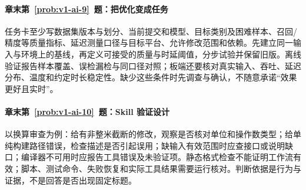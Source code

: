 \paragraph*{章末第~\ref{prob:v1-ai-9}~题：把优化变成任务}
\begin{solution}
任务卡至少写数据集版本与划分、当前提交和模型、目标类别及困难样本、召回/精度等质量指标、延迟测量口径与目标平台、允许修改范围和依赖。先建立同一输入与环境上的基线，再定义可接受的质量与时延阈值，分步试验并保留旧版。离线验证报告样本覆盖、误检漏检与同口径对照；板端还要核对真实输入、吞吐、延迟分布、温度和约定时长稳定性。缺少这些条件时先调查与确认，不随意承诺“效果更好且实时”。
\end{solution}

\paragraph*{章末第~\ref{prob:v1-ai-10}~题：Skill 验证设计}
\begin{solution}
以换算审查为例：给有非整米截断的修改，观察是否核对单位和操作数类型；给单纯构建路径错误，检查描述是否引起误用；缺输入有效范围时应查接口或说明缺口；编译器不可用时应报告工具错误及未验证项。静态格式检查不能证明工作流有效；脚本、测试命令、失败恢复和实际工具结果需要运行核对。判断依据是行为与证据，不是回答是否出现固定标题。
\end{solution}

\endgroup
